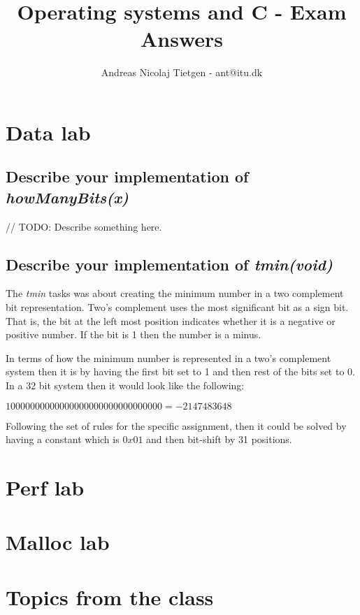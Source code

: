 \documentclass[11pt]{article}
\title{Operating systems and C - Exam Answers}
\author{Andreas Nicolaj Tietgen - ant@itu.dk}
\begin{document}
\maketitle

\section{Data lab}

\subsection{Describe your implementation of \textit{howManyBits(x)}}
// TODO: Describe something here.

\subsection{Describe your implementation of \textit{tmin(void)}}
The \textit{tmin} tasks was about creating the minimum number in a two complement bit representation.
Two's complement uses the most significant bit as a sign bit. That is, the bit at the left most position indicates whether 
it is a negative or positive number. If the bit is 1 then the number is a minus. 

In terms of how the minimum number is represented in a two's complement system then it is by having the first bit set to 1 and then rest of the bits set to 0.
In a 32 bit system then it would look like the following:

$1000 0000 0000 0000 0000 0000 0000 0000 = -2147483648$

Following the set of rules for the specific assignment, then it could be solved by having a constant which is $0x01$
and then bit-shift by 31 positions.   

\section{Perf lab}

\section{Malloc lab}

\section{Topics from the class}
\end{document}
